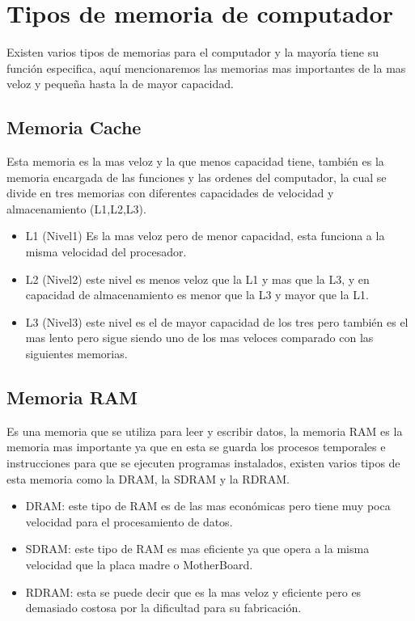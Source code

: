 \documentclass{article}
\begin{document}
	\section{Tipos de memoria de computador} \label{contenido}
	Existen varios tipos de memorias para el computador y la mayoría tiene su función especifica, aquí mencionaremos las memorias mas importantes de la mas veloz y pequeña hasta la de mayor capacidad.
	\subsection{Memoria Cache}
	Esta memoria es la mas veloz y la que menos capacidad tiene, también es la memoria encargada de las funciones y las ordenes del computador, la cual se divide en tres memorias con diferentes capacidades de velocidad y almacenamiento  (L1,L2,L3).
	\begin{itemize}
		\item{L1 (Nivel1) Es la mas veloz pero de menor capacidad, esta funciona a la misma velocidad del procesador.}
		\item{L2 (Nivel2) este nivel es menos veloz que la L1 y mas que la L3, y en capacidad de almacenamiento es menor que la L3 y mayor que la L1.}
		\item {L3 (Nivel3) este nivel es el de mayor capacidad de los tres pero también es el mas lento pero sigue siendo uno de los mas veloces comparado con las siguientes memorias.}
	\end{itemize}
	
	\subsection{Memoria RAM}
	Es una memoria que se utiliza para leer y escribir datos, la memoria RAM es la memoria mas importante ya que en esta se guarda los procesos temporales e instrucciones para que se ejecuten programas instalados, existen varios tipos de esta memoria como la DRAM, la SDRAM y la RDRAM.\cite{ram}
	\begin{itemize}
		\item{DRAM:}
		este tipo de RAM es de las mas económicas pero tiene muy poca velocidad para el procesamiento de datos.   
		
		\item{SDRAM:}
		este tipo de RAM es mas eficiente ya que opera a la misma velocidad que la placa madre o MotherBoard.
		
		\item{RDRAM:}
		esta se puede decir que es la mas veloz y eficiente pero es demasiado costosa por la dificultad para su fabricación.
	\end{itemize}
	
\end{document}
